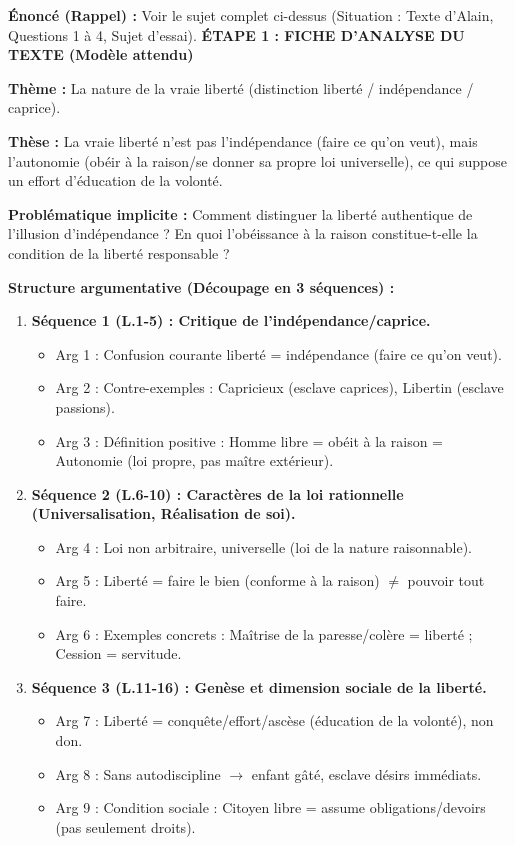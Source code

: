 \documentclass[11pt]{article}
\newcommand{\cle}[1]{{\popxbold\color{popdark}#1}}
\newcounter{popsec}
\newcounter{popsub}
\newcommand{\courssub}[1]{%
  \stepcounter{popsub}%
  \par\vspace{9pt}\noindent{\popxbold\fontsize{11.5}{13}\selectfont\color{popink}{\color{poporange}\thepopsec.\thepopsub}\hspace{6pt}#1}\par\nopagebreak\vspace{4pt}
}
\begin{document}
\courssub{Démarche et corrigé commenté}
\begin{exoresolu}
\textbf{Énoncé (Rappel) :} Voir le sujet complet ci-dessus (Situation : Texte d'Alain, Questions 1 à 4, Sujet d'essai).
\tcblower
\textbf{ÉTAPE 1 : FICHE D'ANALYSE DU TEXTE (Modèle attendu)}

\textbf{Thème :} La nature de la vraie liberté (distinction liberté / indépendance / caprice).

\textbf{Thèse :} La vraie liberté n'est pas l'indépendance (faire ce qu'on veut), mais l'\cle{autonomie} (obéir à la raison/se donner sa propre loi universelle), ce qui suppose un effort d'\cle{éducation de la volonté}.

\textbf{Problématique implicite :} Comment distinguer la liberté authentique de l'illusion d'indépendance ? En quoi l'obéissance à la raison constitue-t-elle la condition de la liberté responsable ?

\textbf{Structure argumentative (Découpage en 3 séquences) :}

\begin{enumerate}
    \item \textbf{Séquence 1 (L.1-5) : Critique de l'indépendance/caprice.} 
    \begin{itemize}
        \item Arg 1 : Confusion courante liberté = indépendance (faire ce qu'on veut).
        \item Arg 2 : Contre-exemples : Capricieux (esclave caprices), Libertin (esclave passions).
        \item Arg 3 : Définition positive : Homme libre = obéit à la raison = \cle{Autonomie} (loi propre, pas maître extérieur).
    \end{itemize}
    \item \textbf{Séquence 2 (L.6-10) : Caractères de la loi rationnelle (Universalisation, Réalisation de soi).}
    \begin{itemize}
        \item Arg 4 : Loi non arbitraire, universelle (loi de la nature raisonnable).
        \item Arg 5 : Liberté = faire le bien (conforme à la raison) $\neq$ pouvoir tout faire.
        \item Arg 6 : Exemples concrets : Maîtrise de la paresse/colère = liberté ; Cession = servitude.
    \end{itemize}
    \item \textbf{Séquence 3 (L.11-16) : Genèse et dimension sociale de la liberté.}
    \begin{itemize}
        \item Arg 7 : Liberté = conquête/effort/\cle{ascèse} (éducation de la volonté), non don.
        \item Arg 8 : Sans autodiscipline $\rightarrow$ enfant gâté, esclave désirs immédiats.
        \item Arg 9 : Condition sociale : Citoyen libre = assume obligations/devoirs (pas seulement droits).
    \end{itemize}
\end{enumerate}


\end{exoresolu}
\end{document}
